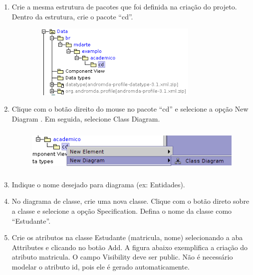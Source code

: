 \begin{enumerate}
	\item Crie a mesma estrutura de pacotes que foi definida na criação do projeto.
Dentro da estrutura, crie o pacote “cd”.
		\begin{figure}[!htb]
			\centering
			\includegraphics[width=250pt,height=100pt]{imgs/tutorial-mdarte-0000.png}
		\end{figure}
	\item Clique com o botão direito do mouse no pacote “cd” e selecione a opção New Diagram .
Em seguida, selecione Class Diagram.
		
		\begin{figure}[!htb]
			\centering
			\includegraphics[width=400pt,height=60pt]{imgs/tutorial-mdarte-0001.png}
		\end{figure}
	
	\item Indique o nome desejado para diagrama (ex: Entidades).
	
	\item No diagrama de classe, crie uma nova classe. Clique com o botão direto
	sobre a classe e selecione a opção Specification. Defina o nome da classe como “Estudante”.
	
	\item Crie os atributos na classe Estudante (matricula, nome) selecionando a aba Attributes e
clicando no botão Add. A figura abaixo exemplifica a criação do atributo matricula. O
campo Visibility deve ser public. Não é necessário modelar o atributo id, pois
ele é gerado automaticamente.


\end{enumerate}
